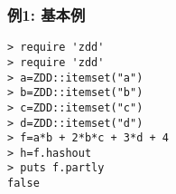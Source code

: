 \subsubsection*{例1: 基本例}



\begin{Verbatim}[baselinestretch=0.7,frame=single]
> require 'zdd'
> require 'zdd'
> a=ZDD::itemset("a")
> b=ZDD::itemset("b")
> c=ZDD::itemset("c")
> d=ZDD::itemset("d")
> f=a*b + 2*b*c + 3*d + 4
> h=f.hashout
> puts f.partly
false
\end{Verbatim}
